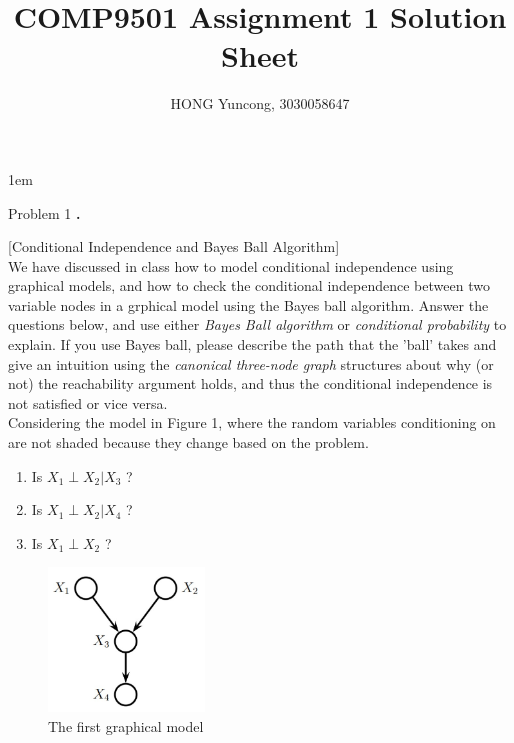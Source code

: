 \documentclass{article}
\newcounter{pcounter}                                   %
\newenvironment{problem}                                %
{                                                       %
    \color{gray}                                        %
    \stepcounter{pcounter}                              %
    \textbf{\arabic{pcounter}.}                         %
}{}                                                     %
\begin{document}
    \parindent 0in
    \parskip 1em
    \title{COMP9501 Assignment 1 Solution Sheet}
    \author{HONG Yuncong, 3030058647}
    \maketitle

    \begin{section}{Problem 1}
        \setcounter{pcounter}{0}
        \begin{problem}
            [Conditional Independence and Bayes Ball Algorithm]\\
            We have discussed in class how to model conditional independence using graphical models, and how to check the conditional independence between two variable nodes in a grphical model using the Bayes ball algorithm. Answer the questions below, and use either \textit{Bayes Ball algorithm} or \textit{conditional probability} to explain. If you use Bayes ball, please describe the path that the 'ball' takes and give an intuition using the \textit{canonical three-node graph} structures about why (or not) the reachability argument holds, and thus the conditional independence is not satisfied or vice versa.\\
            Considering the model in Figure 1, where the random variables conditioning on are not shaded because they change based on the problem.
            \begin{enumerate}[label=(\alph*)]
                \item Is $X_1 \perp X_2 | X_3$ ?
                \item Is $X_1 \perp X_2 | X_4$ ?
                \item Is $X_1 \perp X_2$ ?
            \end{enumerate}
            \begin{figure}[H]
                \label{fig:m1}
                \centering
                \includegraphics[width=0.37\textwidth]{a2_p11_1}
                \caption{The first graphical model}
            \end{figure}


\end{problem}
\end{section}
\end{document}
